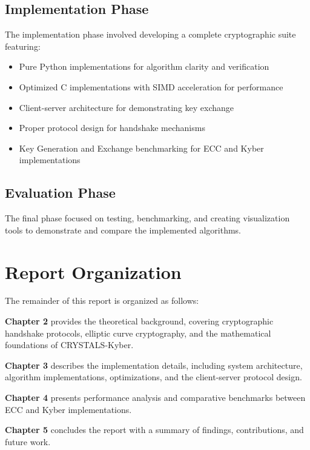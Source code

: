 \subsection{Implementation Phase}
The implementation phase involved developing a complete cryptographic suite featuring:
\begin{itemize}
\item Pure Python implementations for algorithm clarity and verification
\item Optimized C implementations with SIMD acceleration for performance
\item Client-server architecture for demonstrating key exchange
\item Proper protocol design for handshake mechanisms
\item Key Generation and Exchange benchmarking for ECC and Kyber implementations
\end{itemize}

\subsection{Evaluation Phase}
The final phase focused on testing, benchmarking, and creating visualization tools to demonstrate and compare the implemented algorithms.

\section{Report Organization}

The remainder of this report is organized as follows:

\textbf{Chapter 2} provides the theoretical background, covering cryptographic handshake protocols, elliptic curve cryptography, and the mathematical foundations of CRYSTALS-Kyber.

\textbf{Chapter 3} describes the implementation details, including system architecture, algorithm implementations, optimizations, and the client-server protocol design.

\textbf{Chapter 4} presents performance analysis and comparative benchmarks between ECC and Kyber implementations.

\textbf{Chapter 5} concludes the report with a summary of findings, contributions, and future work.